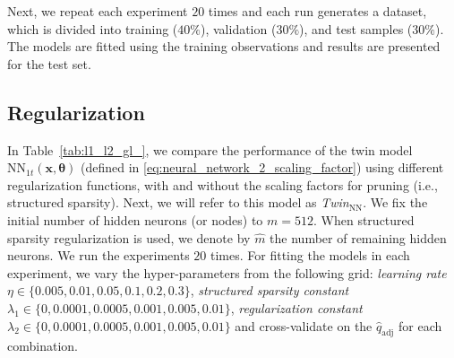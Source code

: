\documentclass{article}
\def\qadj{\hat{q}_{\mathrm{adj}}}
\def\x{\mathbf x}
\begin{document}
Next, we repeat each experiment $20$ times and each run generates a dataset, which is divided into training ($40\%$), validation ($30\%$), and test samples ($30\%$). The models are fitted using the training observations and results are presented for the test set.

\subsection{Regularization} 

In Table~\ref{tab:l1_l2_gl_}, we compare the performance of the twin model $\mathrm{NN}_{1t}(\x, \boldsymbol{\theta})$ (defined in \eqref{eq:neural_network_2_scaling_factor}) using different regularization functions, with and without the scaling factors for pruning (i.e., structured sparsity). Next, we will refer to this model as {\it Twin$_{\mathrm{NN}}$}. We fix the initial number of hidden neurons (or nodes) to $m=512 $. When structured sparsity regularization is used, we denote by $\hat m$ the number of remaining hidden neurons. We run the experiments $20$ times.  For fitting the models in each experiment, we vary the hyper-parameters from the following grid: \textit{learning rate} $\eta \in \{ 0.005, 0.01, 0.05, 0.1, 0.2, 0.3 \}$, \textit{structured sparsity constant} $\lambda_1 \in \{0, 0.0001, 0.0005, 0.001, 0.005, 0.01 \}$, \textit{regularization constant} $\lambda_2 \in \{0, 0.0001, 0.0005, 0.001, 0.005, 0.01 \}$ and cross-validate on the $\qadj$ for each combination.
\end{document}
